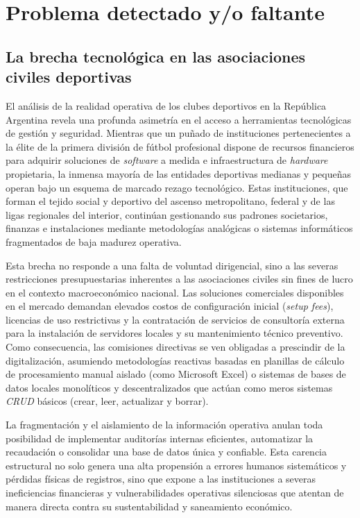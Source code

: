 \section{Problema detectado y/o faltante}

\subsection{La brecha tecnológica en las asociaciones civiles deportivas}

El análisis de la realidad operativa de los clubes deportivos en la República Argentina revela una profunda asimetría en el acceso a herramientas tecnológicas de gestión y seguridad. Mientras que un puñado de instituciones pertenecientes a la élite de la primera división de fútbol profesional dispone de recursos financieros para adquirir soluciones de \textit{software} a medida e infraestructura de \textit{hardware} propietaria, la inmensa mayoría de las entidades deportivas medianas y pequeñas operan bajo un esquema de marcado rezago tecnológico. Estas instituciones, que forman el tejido social y deportivo del ascenso metropolitano, federal y de las ligas regionales del interior, continúan gestionando sus padrones societarios, finanzas e instalaciones mediante metodologías analógicas o sistemas informáticos fragmentados de baja madurez operativa.

Esta brecha no responde a una falta de voluntad dirigencial, sino a las severas restricciones presupuestarias inherentes a las asociaciones civiles sin fines de lucro en el contexto macroeconómico nacional. Las soluciones comerciales disponibles en el mercado demandan elevados costos de configuración inicial (\textit{setup fees}), licencias de uso restrictivas y la contratación de servicios de consultoría externa para la instalación de servidores locales y su mantenimiento técnico preventivo. Como consecuencia, las comisiones directivas se ven obligadas a prescindir de la digitalización, asumiendo metodologías reactivas basadas en planillas de cálculo de procesamiento manual aislado (como Microsoft Excel) o sistemas de bases de datos locales monolíticos y descentralizados que actúan como meros sistemas \textit{CRUD} básicos (crear, leer, actualizar y borrar). 

La fragmentación y el aislamiento de la información operativa anulan toda posibilidad de implementar auditorías internas eficientes, automatizar la recaudación o consolidar una base de datos única y confiable. Esta carencia estructural no solo genera una alta propensión a errores humanos sistemáticos y pérdidas físicas de registros, sino que expone a las instituciones a severas ineficiencias financieras y vulnerabilidades operativas silenciosas que atentan de manera directa contra su sustentabilidad y saneamiento económico.

